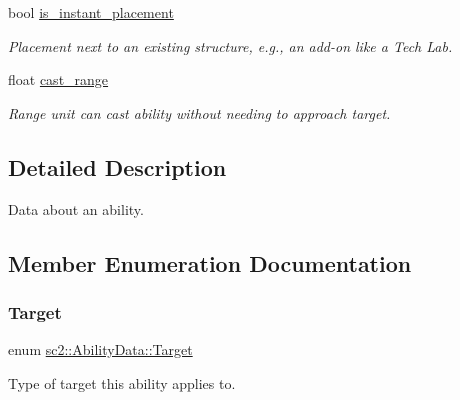\begin{DoxyCompactItemize}
bool \hyperlink{structsc2_1_1_ability_data_a9fe8873ca4353862d1e2425526628ec1}{is\+\_\+instant\+\_\+placement}
\begin{DoxyCompactList}\small\item\em Placement next to an existing structure, e.\+g., an add-\/on like a Tech Lab. \end{DoxyCompactList}\item 
\mbox{\label{structsc2_1_1_ability_data_ac70e65166f5a291b28da3c97c71833b4}} 
float \hyperlink{structsc2_1_1_ability_data_ac70e65166f5a291b28da3c97c71833b4}{cast\+\_\+range}
\begin{DoxyCompactList}\small\item\em Range unit can cast ability without needing to approach target. \end{DoxyCompactList}\end{DoxyCompactItemize}


\subsection{Detailed Description}
Data about an ability. 

\subsection{Member Enumeration Documentation}
\mbox{\label{structsc2_1_1_ability_data_a15aaa20bd058eeb35728e2eeff6518f6}} 
\subsubsection{\texorpdfstring{Target}{Target}}
{\footnotesize\ttfamily enum \hyperlink{structsc2_1_1_ability_data_a15aaa20bd058eeb35728e2eeff6518f6}{sc2\+::\+Ability\+Data\+::\+Target}\hspace{0.3cm}{\ttfamily [strong]}}



Type of target this ability applies to. 

